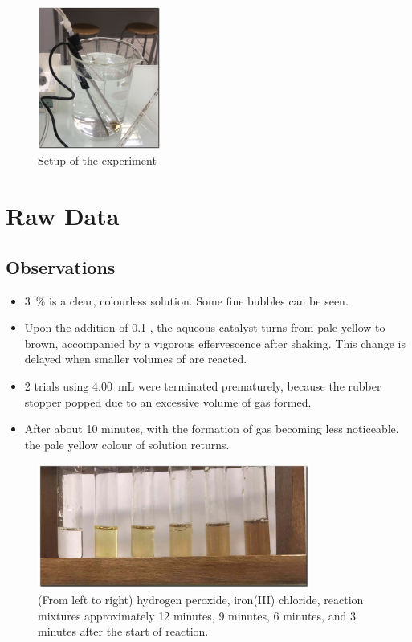 \documentclass[a4paper, 12pt]{article}
\begin{document}
\begin{figure}[hbt]
    \centering
    \includegraphics[width=0.36\textwidth]{imgs/setup}
    \caption{Setup of the experiment}
    \label{fig:setup}
\end{figure}


\section*{Raw Data}
\subsection*{Observations}
\begin{itemize}
    \item \SI{3}{\percent}  is a clear, colourless solution. Some fine bubbles can be seen.
    \item Upon the addition of \SI{0.1}{\molar} , the aqueous catalyst turns from pale yellow to brown, accompanied by a vigorous effervescence after shaking. This change is delayed when smaller volumes of  are reacted.
    \item 2 trials using \SI{4.00}{\mL}  were terminated prematurely, because the rubber stopper popped due to an excessive volume of gas formed.
    \item After about 10 minutes, with the formation of gas becoming less noticeable, the pale yellow colour of  solution returns.
\end{itemize}

\newpage

\begin{figure}[H]
    \centering
    \includegraphics[width=0.8\textwidth]{imgs/colours}
    \caption{(From left to right) hydrogen peroxide, iron(III) chloride, reaction mixtures approximately 12 minutes, 9 minutes, 6 minutes, and 3 minutes after the start of reaction. }
    \label{fig:colours}
\end{figure}
\end{document}

